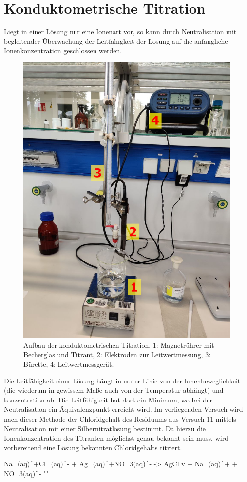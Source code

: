 	\section{Konduktometrische Titration}\label{sec:titration}
		Liegt in einer Lösung nur eine Ionenart vor, so kann durch Neutralisation mit begleitender Überwachung der Leitfähigkeit der Lösung
		auf die anfängliche Ionenkonzentration geschlossen werden.
		\begin{figure}[h]
			\centering
			\includegraphics[width=.7\textwidth]{assets/photos/aufbau1_edit.jpg}
			\caption[aufbau Titration]{Aufbau der konduktometrischen Titration. 1: Magnetrührer mit Becherglas und Titrant, 2: Elektroden zur Leitwertmessung, 3: Bürette, 4: Leitwertmessgerät.}
			\label{fig:aufbau titration}
		\end{figure}
		Die Leitfähigkeit einer Lösung hängt in erster Linie von der Ionenbeweglichkeit (die wiederum in gewissem Maße auch von der Temperatur abhängt) und
		-konzentration ab. Die Leitfähigkeit hat dort ein Minimum, wo bei der Neutralisation ein Äquivalenzpunkt erreicht wird.
		Im vorliegenden Versuch wird nach dieser Methode der Chloridgehalt des Residuums aus Versuch 11 mittels Neutralisation mit einer Silbernitratlösung bestimmt.
		Da hierzu die Ionenkonzentration des Titranten möglichst genau bekannt sein muss, wird vorbereitend eine Lösung bekannten Chloridgehalts
		titriert. \nocite{Analytische.Chemie.I.Ritgen.2019}
		\begin{reaction}
			Na_{(aq)}^{+}Cl_{(aq)}^{-} + Ag_{(aq)}^{+}NO_{3(aq)}^{-} -> AgCl v + Na_{(aq)}^{+} + NO_{3(aq)}^{-} "\label{re:NaCl und AgNO3}"
		\end{reaction}
